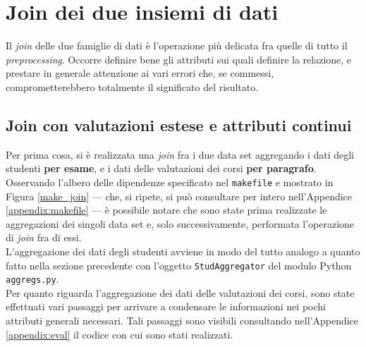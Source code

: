 		\vspace{0.3cm}

\section{Join dei due insiemi di dati}

	Il \textit{join} delle due famiglie di dati è l'operazione più delicata fra quelle di tutto il \textit{preprocessing}. Occorre definire bene gli attributi sui quali definire la relazione, e prestare in generale attenzione ai vari errori che, se commessi, comprometterebbero totalmente il significato del risultato. \\

	\subsection{Join con valutazioni estese e attributi continui}

		Per prima cosa, si è realizzata una \textit{join} fra i due data set aggregando i dati degli studenti \textbf{per esame}, e i dati delle valutazioni dei corsi \textbf{per paragrafo}. Osservando l'albero delle dipendenze specificato nel \texttt{makefile} e mostrato in Figura \ref{make_join} --- che, si ripete, si può consultare per intero nell'Appendice \ref{appendix:makefile} --- è possibile notare che sono state prima realizzate le aggregazioni dei singoli data set e, solo successivamente, performata l'operazione di \textit{join} fra di essi. \\

		L'aggregazione dei dati degli studenti avviene in modo del tutto analogo a quanto fatto nella sezione precedente con l'oggetto \texttt{StudAggregator} del modulo Python \texttt{aggregs.py}. \\

		Per quanto riguarda l'aggregazione dei dati delle valutazioni dei corsi, sono state effettuati vari passaggi per arrivare a condensare le informazioni nei pochi attributi generali necessari. Tali passaggi sono visibili consultando nell'Appendice \ref{appendix:eval} il codice con cui sono stati realizzati. \\

